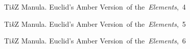 \documentclass[a4paper,11pt]{article}
\begin{document}
\begin{figure}[ht]

  \centering

  \begin{tikzpicture}









  \end{tikzpicture}

  \caption{Ti\textit{k}Z Manula. Euclid's Amber Version~of
    the~\textit{Elements},~4}

\end{figure}





\begin{figure}[ht]

  \centering

  \begin{tikzpicture}











  \end{tikzpicture}

  \caption{Ti\textit{k}Z Manula. Euclid's Amber Version~of
    the~\textit{Elements},~5}

\end{figure}





\begin{figure}[ht]

  \centering

  \begin{tikzpicture}













  \end{tikzpicture}

  \caption{Ti\textit{k}Z Manula. Euclid's Amber Version~of
    the~\textit{Elements},~6}

\end{figure}
\end{document}
